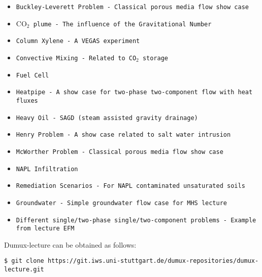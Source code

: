 \begin{itemize}
\item \texttt{Buckley-Leverett Problem - Classical porous media flow show case}
\item \texttt{$\text{CO}_2$ plume - The influence of the Gravitational Number}
\item \texttt{Column Xylene - A VEGAS experiment}
\item \texttt{Convective Mixing - Related to CO$_2$ storage}
\item \texttt{Fuel Cell}
\item \texttt{Heatpipe - A show case for two-phase two-component flow with heat fluxes}
\item \texttt{Heavy Oil - SAGD (steam assisted gravity drainage)}
\item \texttt{Henry Problem - A show case related to salt water intrusion}
\item \texttt{McWorther Problem - Classical porous media flow show case}
\item \texttt{NAPL Infiltration}
\item \texttt{Remediation Scenarios - For NAPL contaminated unsaturated soils}
\item \texttt{Groundwater - Simple groundwater flow case for MHS lecture}
\item \texttt{Different single/two-phase single/two-component problems - Example from lecture EFM}
\end{itemize}

Dumux-lecture can be obtained as follows:
\begin{lstlisting}[style=Bash]
$ git clone https://git.iws.uni-stuttgart.de/dumux-repositories/dumux-lecture.git
\end{lstlisting}
